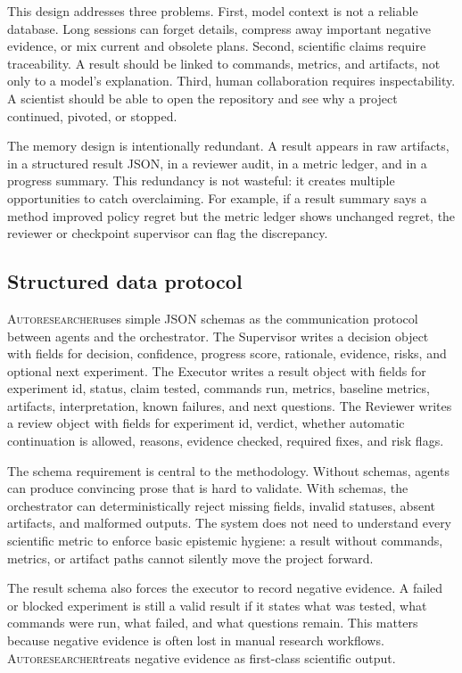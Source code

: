 \documentclass{article}
\newcommand{\sys}{\textsc{Autoresearcher}}
\begin{document}
This design addresses three problems. First, model context is not a reliable database. Long sessions can forget details, compress away important negative evidence, or mix current and obsolete plans. Second, scientific claims require traceability. A result should be linked to commands, metrics, and artifacts, not only to a model's explanation. Third, human collaboration requires inspectability. A scientist should be able to open the repository and see why a project continued, pivoted, or stopped.

The memory design is intentionally redundant. A result appears in raw artifacts, in a structured result JSON, in a reviewer audit, in a metric ledger, and in a progress summary. This redundancy is not wasteful: it creates multiple opportunities to catch overclaiming. For example, if a result summary says a method improved policy regret but the metric ledger shows unchanged regret, the reviewer or checkpoint supervisor can flag the discrepancy.

\subsection{Structured data protocol}

\sys uses simple JSON schemas as the communication protocol between agents and the orchestrator. The Supervisor writes a decision object with fields for decision, confidence, progress score, rationale, evidence, risks, and optional next experiment. The Executor writes a result object with fields for experiment id, status, claim tested, commands run, metrics, baseline metrics, artifacts, interpretation, known failures, and next questions. The Reviewer writes a review object with fields for experiment id, verdict, whether automatic continuation is allowed, reasons, evidence checked, required fixes, and risk flags.

The schema requirement is central to the methodology. Without schemas, agents can produce convincing prose that is hard to validate. With schemas, the orchestrator can deterministically reject missing fields, invalid statuses, absent artifacts, and malformed outputs. The system does not need to understand every scientific metric to enforce basic epistemic hygiene: a result without commands, metrics, or artifact paths cannot silently move the project forward.

The result schema also forces the executor to record negative evidence. A failed or blocked experiment is still a valid result if it states what was tested, what commands were run, what failed, and what questions remain. This matters because negative evidence is often lost in manual research workflows. \sys treats negative evidence as first-class scientific output.
\end{document}
